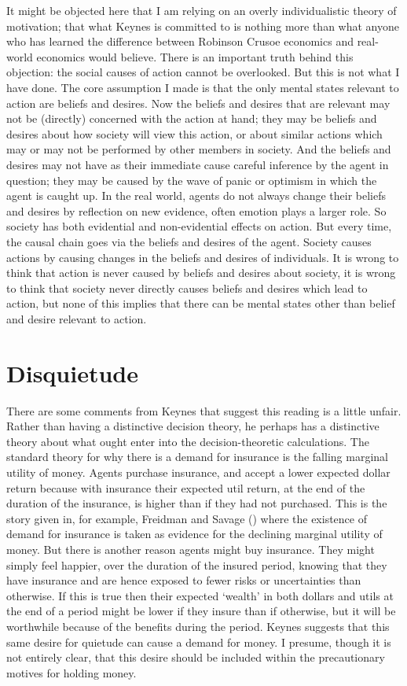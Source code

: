 \documentclass[
  10pt,
  letterpaper,
  DIV=11,
  numbers=noendperiod,
  twoside]{scrartcl}
\begin{document}
It might be objected here that I am relying on an overly individualistic
theory of motivation; that what Keynes is committed to is nothing more
than what anyone who has learned the difference between Robinson Crusoe
economics and real-world economics would believe. There is an important
truth behind this objection: the social causes of action cannot be
overlooked. But this is not what I have done. The core assumption I made
is that the only mental states relevant to action are beliefs and
desires. Now the beliefs and desires that are relevant may not be
(directly) concerned with the action at hand; they may be beliefs and
desires about how society will view this action, or about similar
actions which may or may not be performed by other members in society.
And the beliefs and desires may not have as their immediate cause
careful inference by the agent in question; they may be caused by the
wave of panic or optimism in which the agent is caught up. In the real
world, agents do not always change their beliefs and desires by
reflection on new evidence, often emotion plays a larger role. So
society has both evidential and non-evidential effects on action. But
every time, the causal chain goes via the beliefs and desires of the
agent. Society causes actions by causing changes in the beliefs and
desires of individuals. It is wrong to think that action is never caused
by beliefs and desires about society, it is wrong to think that society
never directly causes beliefs and desires which lead to action, but none
of this implies that there can be mental states other than belief and
desire relevant to action.

\section{Disquietude}\label{disquietude}

There are some comments from Keynes that suggest this reading is a
little unfair. Rather than having a distinctive decision theory, he
perhaps has a distinctive theory about what ought enter into the
decision-theoretic calculations. The standard theory for why there is a
demand for insurance is the falling marginal utility of money. Agents
purchase insurance, and accept a lower expected dollar return because
with insurance their expected util return, at the end of the duration of
the insurance, is higher than if they had not purchased. This is the
story given in, for example, Freidman and Savage
() where the existence of demand
for insurance is taken as evidence for the declining marginal utility of
money. But there is another reason agents might buy insurance. They
might simply feel happier, over the duration of the insured period,
knowing that they have insurance and are hence exposed to fewer risks or
uncertainties than otherwise. If this is true then their expected
`wealth' in both dollars and utils at the end of a period might be lower
if they insure than if otherwise, but it will be worthwhile because of
the benefits during the period. Keynes suggests that this same desire
for quietude can cause a demand for money. I presume, though it is not
entirely clear, that this desire should be included within the
precautionary motives for holding money.
\end{document}
